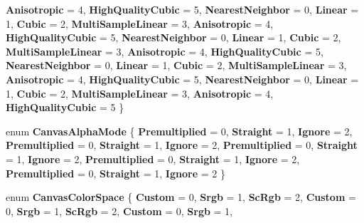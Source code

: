 \begin{DoxyCompactItemize}
{\bfseries Anisotropic} = 4, 
{\bfseries High\+Quality\+Cubic} = 5, 
{\bfseries Nearest\+Neighbor} = 0, 
{\bfseries Linear} = 1, 
\newline
{\bfseries Cubic} = 2, 
{\bfseries Multi\+Sample\+Linear} = 3, 
{\bfseries Anisotropic} = 4, 
{\bfseries High\+Quality\+Cubic} = 5, 
\newline
{\bfseries Nearest\+Neighbor} = 0, 
{\bfseries Linear} = 1, 
{\bfseries Cubic} = 2, 
{\bfseries Multi\+Sample\+Linear} = 3, 
\newline
{\bfseries Anisotropic} = 4, 
{\bfseries High\+Quality\+Cubic} = 5, 
{\bfseries Nearest\+Neighbor} = 0, 
{\bfseries Linear} = 1, 
\newline
{\bfseries Cubic} = 2, 
{\bfseries Multi\+Sample\+Linear} = 3, 
{\bfseries Anisotropic} = 4, 
{\bfseries High\+Quality\+Cubic} = 5, 
\newline
{\bfseries Nearest\+Neighbor} = 0, 
{\bfseries Linear} = 1, 
{\bfseries Cubic} = 2, 
{\bfseries Multi\+Sample\+Linear} = 3, 
\newline
{\bfseries Anisotropic} = 4, 
{\bfseries High\+Quality\+Cubic} = 5
 \}
\item 
\mbox{\label{namespace_microsoft_1_1_graphics_1_1_canvas_a1ab747c729197befb5d2c28b22e08bc3}} 
enum {\bfseries Canvas\+Alpha\+Mode} \{ \newline
{\bfseries Premultiplied} = 0, 
{\bfseries Straight} = 1, 
{\bfseries Ignore} = 2, 
{\bfseries Premultiplied} = 0, 
\newline
{\bfseries Straight} = 1, 
{\bfseries Ignore} = 2, 
{\bfseries Premultiplied} = 0, 
{\bfseries Straight} = 1, 
\newline
{\bfseries Ignore} = 2, 
{\bfseries Premultiplied} = 0, 
{\bfseries Straight} = 1, 
{\bfseries Ignore} = 2, 
\newline
{\bfseries Premultiplied} = 0, 
{\bfseries Straight} = 1, 
{\bfseries Ignore} = 2
 \}
\item 
\mbox{\label{namespace_microsoft_1_1_graphics_1_1_canvas_a968dbdb8c3779105d9af1ee42d19efa5}} 
enum {\bfseries Canvas\+Color\+Space} \{ \newline
{\bfseries Custom} = 0, 
{\bfseries Srgb} = 1, 
{\bfseries Sc\+Rgb} = 2, 
{\bfseries Custom} = 0, 
\newline
{\bfseries Srgb} = 1, 
{\bfseries Sc\+Rgb} = 2, 
{\bfseries Custom} = 0, 
{\bfseries Srgb} = 1, 
\newline

\end{DoxyCompactItemize}
